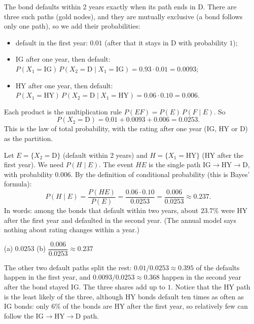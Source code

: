 \begin{solution}
	 The bond defaults within 2 years exactly when its path ends in
	D. There are three such paths (gold nodes), and they are mutually
	exclusive (a bond follows only one path), so we add their probabilities:
	\begin{itemize}
		\item default in the first year: $0.01$ (after that it stays in D with
		      probability $1$);
		\item IG after one year, then default:
		      $P(X_1=\text{IG})\,P(X_2=\text{D}\mid X_1=\text{IG})=0.93\cdot0.01=0.0093$;
		\item HY after one year, then default:
		      $P(X_1=\text{HY})\,P(X_2=\text{D}\mid X_1=\text{HY})=0.06\cdot0.10=0.006$.
	\end{itemize}
	Each product is the multiplication rule $P(EF)=P(E)\,P(F\mid E)$. So
	\[ P(X_2=\text{D}) = 0.01+0.0093+0.006 = 0.0253. \]
	This is the law of total probability, with the rating after one year
	(IG, HY or D) as the partition.

	 Let $E=\{X_2=\text{D}\}$ (default within 2 years) and
	$H=\{X_1=\text{HY}\}$ (HY after the first year). We need $P(H\mid E)$. The
	event $HE$ is the single path IG$\to$HY$\to$D, with probability $0.006$.
	By the definition of conditional probability (this is Bayes' formula):
	\[ P(H\mid E)=\frac{P(HE)}{P(E)}=\frac{0.06\cdot0.10}{0.0253}
		=\frac{0.006}{0.0253}\approx 0.237. \]
	In words: among the bonds that default within two years, about $23.7\%$
	were HY after the first year and defaulted in the second year. (The
	annual model says nothing about rating changes within a year.)

	\begin{answer}
		(a) $0.0253$ \qquad (b) $\dfrac{0.006}{0.0253}\approx 0.237$
	\end{answer}
	\begin{remark}
		The other two default paths split the rest:
		$0.01/0.0253\approx0.395$ of the defaults happen in the first year, and
		$0.0093/0.0253\approx0.368$ happen in the second year after the bond
		stayed IG. The three shares add up to $1$.
		Notice that the HY path is the least likely of the three, although HY
		bonds default ten times as often as IG bonds: only $6\%$ of the bonds
		are HY after the first year, so relatively few can follow the
		IG$\to$HY$\to$D path.
	\end{remark}
\end{solution}
